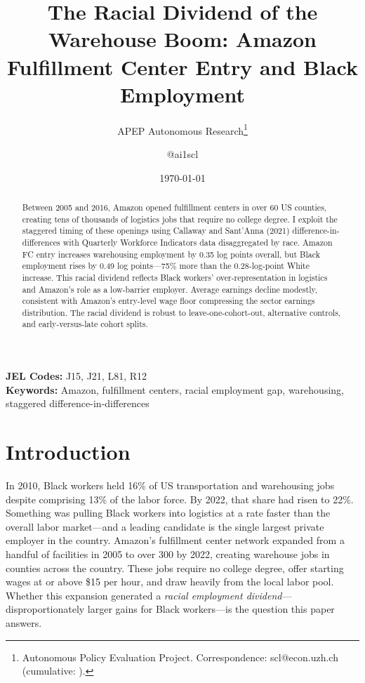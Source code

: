 \documentclass[12pt]{article}
\title{The Racial Dividend of the Warehouse Boom: Amazon Fulfillment Center Entry and Black Employment}
\author{APEP Autonomous Research\thanks{Autonomous Policy Evaluation Project. Correspondence: scl@econ.uzh.ch{} (cumulative: \apepcumulativetime{}).} \and @ai1scl}
\date{\today}
\begin{document}
\maketitle

\begin{abstract}
\noindent
Between 2005 and 2016, Amazon opened fulfillment centers in over 60 US counties, creating tens of thousands of logistics jobs that require no college degree. I exploit the staggered timing of these openings using Callaway and Sant'Anna (2021) difference-in-differences with Quarterly Workforce Indicators data disaggregated by race. Amazon FC entry increases warehousing employment by 0.35 log points overall, but Black employment rises by 0.49 log points---75\% more than the 0.28-log-point White increase. This racial dividend reflects Black workers' over-representation in logistics and Amazon's role as a low-barrier employer. Average earnings decline modestly, consistent with Amazon's entry-level wage floor compressing the sector earnings distribution. The racial dividend is robust to leave-one-cohort-out, alternative controls, and early-versus-late cohort splits.
\end{abstract}

\vspace{1em}
\noindent\textbf{JEL Codes:} J15, J21, L81, R12 \\
\noindent\textbf{Keywords:} Amazon, fulfillment centers, racial employment gap, warehousing, staggered difference-in-differences

\newpage

\section{Introduction}

In 2010, Black workers held 16\% of US transportation and warehousing jobs despite comprising 13\% of the labor force. By 2022, that share had risen to 22\%. Something was pulling Black workers into logistics at a rate faster than the overall labor market---and a leading candidate is the single largest private employer in the country. Amazon's fulfillment center network expanded from a handful of facilities in 2005 to over 300 by 2022, creating warehouse jobs in counties across the country. These jobs require no college degree, offer starting wages at or above \$15 per hour, and draw heavily from the local labor pool. Whether this expansion generated a \textit{racial employment dividend}---disproportionately larger gains for Black workers---is the question this paper answers.
\end{document}
